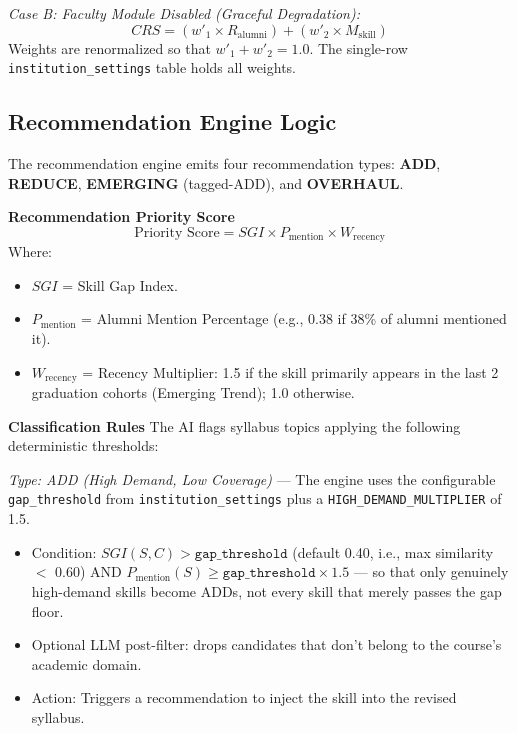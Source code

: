 \textit{Case B: Faculty Module Disabled (Graceful Degradation):}
\[
CRS = (w'_1 \times R_{\text{alumni}}) + (w'_2 \times M_{\text{skill}})
\]
Weights are renormalized so that $w'_1 + w'_2 = 1.0$. The single-row \texttt{institution\_settings} table holds all weights.

\subsection{Recommendation Engine Logic}
The recommendation engine emits four recommendation types: \textbf{ADD}, \textbf{REDUCE}, \textbf{EMERGING} (tagged-ADD), and \textbf{OVERHAUL}.

\textbf{Recommendation Priority Score}
\[
\text{Priority Score} = SGI \times P_{\text{mention}} \times W_{\text{recency}}
\]
Where:
\begin{itemize}
    \item $SGI$ = Skill Gap Index.
    \item $P_{\text{mention}}$ = Alumni Mention Percentage (e.g., 0.38 if 38\% of alumni mentioned it).
    \item $W_{\text{recency}}$ = Recency Multiplier: 1.5 if the skill primarily appears in the last 2 graduation cohorts (Emerging Trend); 1.0 otherwise.
\end{itemize}

\textbf{Classification Rules}
The AI flags syllabus topics applying the following deterministic thresholds:

\textit{Type: ADD (High Demand, Low Coverage)} --- The engine uses the configurable \texttt{gap\_threshold} from \texttt{institution\_settings} plus a \texttt{HIGH\_DEMAND\_MULTIPLIER} of 1.5.
\begin{itemize}
    \item Condition: $SGI(S, C) > \texttt{gap\_threshold}$ (default 0.40, i.e., max similarity $<$ 0.60) AND $P_{\text{mention}}(S) \geq \texttt{gap\_threshold} \times 1.5$ --- so that only genuinely high-demand skills become ADDs, not every skill that merely passes the gap floor.
    \item Optional LLM post-filter: drops candidates that don't belong to the course's academic domain.
    \item Action: Triggers a recommendation to inject the skill into the revised syllabus.
\end{itemize}

